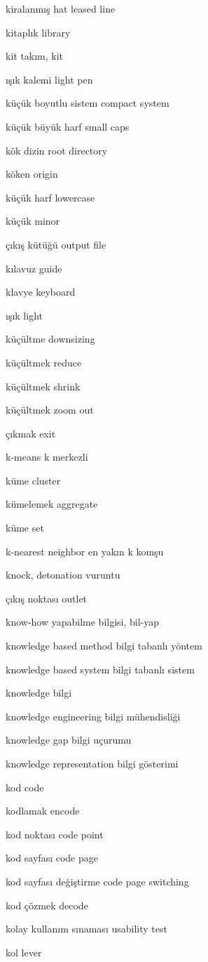 \documentclass[12pt,fleqn]{article}\usepackage{../../common}
\begin{document}
kiralanmış hat leased line

kitaplık library

kit takım, kit

ışık kalemi light pen

küçük boyutlu sistem compact system

küçük büyük harf small caps

kök dizin root directory

köken origin

küçük harf lowercase

küçük minor

çıkış kütüğü output file

kılavuz guide

klavye keyboard

ışık light

küçültme downsizing

küçültmek reduce

küçültmek shrink

küçültmek zoom out

çıkmak exit

k-means k merkezli

küme cluster

kümelemek aggregate

küme set

k-nearest neighbor en yakın k komşu

knock, detonation vuruntu

çıkış noktası outlet

know-how yapabilme bilgisi, bil-yap

knowledge based method bilgi tabanlı yöntem

knowledge based system bilgi tabanlı sistem

knowledge bilgi

knowledge engineering bilgi mühendisliği

knowledge gap bilgi uçurumu

knowledge representation bilgi gösterimi

kod code

kodlamak encode

kod noktası code point

kod sayfası code page

kod sayfası değiştirme code page switching

kod çözmek decode

kolay kullanım sınaması usability test

kol lever
\end{document}
